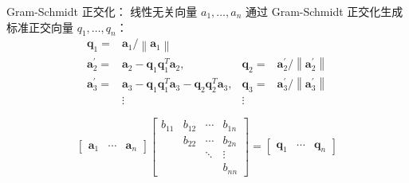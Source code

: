 \begin{remark}
    Gram-Schmidt 正交化：
    线性无关向量 $a_1, \dots, a_n$ 通过 Gram-Schmidt 正交化生成标准正交向量 $q_1, \dots, q_n$：
    \begin{align*}
        \boldsymbol{q}_{1}= & \boldsymbol{a}_{1} /\left\|\boldsymbol{a}_{1}\right\| & & \\
        \boldsymbol{a}_{2}^{\prime}= &\boldsymbol{a}_{2}-\boldsymbol{q}_{1} \boldsymbol{q}_{1}^{T} \boldsymbol{a}_{2}, & \boldsymbol{q}_{2}=&\boldsymbol{a}_{2}^{\prime} /\left\|\boldsymbol{a}_{2}^{\prime}\right\| \\
        \boldsymbol{a}_{3}^{\prime}= & \boldsymbol{a}_{3}-\boldsymbol{q}_{1} \boldsymbol{q}_{1}^{T} \boldsymbol{a}_{3}-\boldsymbol{q}_{2} \boldsymbol{q}_{2}^{T} \boldsymbol{a}_{3}, & \boldsymbol{q}_{3}=&\boldsymbol{a}_{3}^{\prime} /\left\|\boldsymbol{a}_{3}^{\prime}\right\| \\
        & \vdots & \vdots &
    \end{align*}

    \[\begin{bmatrix}
        \boldsymbol{a}_{1} & \cdots & \boldsymbol{a}_{n}
    \end{bmatrix}\begin{bmatrix}
        b_{11} & b_{12} & \cdots & b_{1 n} \\
        & b_{22} & \cdots & b_{2 n} \\
        & & \ddots & \vdots \\
        & & & b_{n n}
    \end{bmatrix}=\begin{bmatrix}
        \boldsymbol{q}_{1} & \cdots & \boldsymbol{q}_{n}
    \end{bmatrix}\]


\end{remark}
